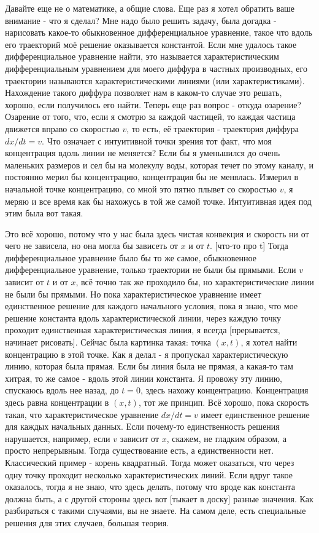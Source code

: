 
Давайте еще не о математике, а общие слова. Еще раз я хотел обратить ваше внимание - что я сделал? Мне надо было решить задачу, была догадка - нарисовать какое-то обыкновенное дифференциальное уравнение, такое что вдоль его траекторий моё решение оказывается константой. Если мне удалось такое дифференциальное уравнение найти, это называется характеристическим дифференциальным уравнением для моего диффура в частных производных, его траектории называются характеристическими линиями (или характеристиками). Нахождение такого диффура позволяет нам в каком-то случае это решать, хорошо, если получилось его найти. Теперь еще раз вопрос - откуда озарение? Озарение от того, что, если я смотрю за каждой частицей, то каждая частица движется вправо со скоростью $v$, то есть, её траектория - траектория диффура $dx/dt = v$. Что означает с интуитивной точки зрения тот факт, что моя концентрация вдоль линии не меняется? Если бы я уменьшился до очень маленьких размеров и сел бы на молекулу воды, которая течет по этому каналу, и постоянно мерил бы концентрацию, концентрация бы не менялась. Измерил в начальной точке концентрацию, со мной это пятно плывет со скоростью $v$, я меряю и все время как бы нахожусь в той же самой точке. Интуитивная идея под этим была вот такая.

Это всё хорошо, потому что у нас была здесь чистая конвекция и скорость ни от чего не зависела, но она могла бы зависеть от $x$ и от $t$. [что-то про t] Тогда дифференциальное уравнение было бы то же самое, обыкновенное дифференциальное уравнение, только траектории не были бы прямыми. Если $v$ зависит от $t$ и от $x$, всё точно так же проходило бы, но характеристические линии не были бы прямыми. Но пока характеристическое уравнение имеет единственное решение для каждого начального условия, пока я знаю, что мое решение константа вдоль характеристической линии, через каждую точку проходит единственная характеристическая линия, я всегда [прерывается, начинает рисовать]. Сейчас была картинка такая: точка $(x, t)$, я хотел найти концентрацию в этой точке. Как я делал - я пропускал характеристическую линию, которая была прямая. Если бы линия была не прямая, а какая-то там хитрая, то же самое - вдоль этой линии константа. Я провожу эту линию, спускаюсь вдоль нее назад, до $t = 0$, здесь нахожу концентрацию. Концентрация здесь равна концентрации в $(x, t)$, тот же принцип. Всё хорошо, пока скорость такая, что характеристическое уравнение $dx/dt = v$ имеет единственное решение для каждых начальных данных. Если почему-то единственность решения нарушается, например, если $v$ зависит от $x$, скажем, не гладким образом, а просто непрерывным. Тогда существование есть, а единственности нет. Классический пример - корень квадратный. Тогда может оказаться, что через одну точку проходит несколько характеристических линий. Если вдруг такое оказалось, тогда я не знаю, что здесь делать, потому что вроде как константа должна быть, а с другой стороны здесь вот [тыкает в доску] разные значения. Как разбираться с такими случаями, вы не знаете. На самом деле, есть специальные решения для этих случаев, большая теория.

